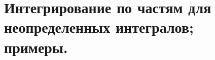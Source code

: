\documentclass[../main.tex]{subfiles}
\begin{document}
\newpage
\section{Интегрирование по частям для неопределенных интегралов; примеры.}
\end{document}
